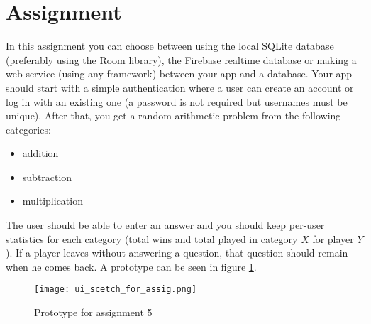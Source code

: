 \section{Assignment}
In this assignment you can choose between using the local SQLite database (preferably using the Room library), the Firebase realtime database or making a web service (using any framework) between your app and a database. Your app should start with a simple authentication where a user can create an account or log in with an existing one (a password is not required but usernames must be unique). After that, you get a random arithmetic problem from the following categories:
\begin{itemize}
\item addition
\item subtraction
\item multiplication
\end{itemize}
The user should be able to enter an answer and you should keep per-user statistics for each category (total wins and total played in category $X$ for player $Y$). If a player leaves without answering a question, that question should remain when he comes back. A prototype can be seen in figure \ref{fig:proto}.
\begin{figure}[H]
\centering
\texttt{[image: ui\_scetch\_for\_assig.png]}
\caption{Prototype for assignment 5}
\label{fig:proto}
\end{figure}